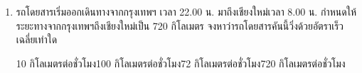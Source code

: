 \begin{enumerate}
	\item \ncmu รถโดยสารเริ่มออกเดินทางจากกรุงเทพฯ  เวลา   22.00  น.   มาถึงเชียงใหม่เวลา    	8.00 น.   กำหนดให้ระยะทางจากกรุงเทพฯถึงเชียงใหม่เป็น   720  กิโลเมตร   จงหาว่ารถโดยสารคันนี้วิ่งด้วยอัตราเร็วเฉลี่ยเท่าใด \runningj
	\begin{2c}
		{10  กิโลเมตรต่อชั่วโมง}{100  กิโลเมตรต่อชั่วโมง}{72  กิโลเมตรต่อชั่วโมง}{720  กิโลเมตรต่อชั่วโมง}
	\end{2c}
\end{enumerate}
